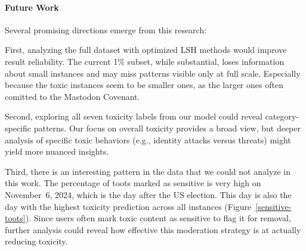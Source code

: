 \newpage

\paragraph{Future Work}
Several promising directions emerge from this research:

First, analyzing the full dataset with optimized LSH methods would improve result reliability. The current 1\% subset, while substantial, loses information about small instances and may miss patterns visible only at full scale. Especially because the toxic instances seem to be smaller ones, as the larger ones often comitted to the Mastodon Covenant.

Second, exploring all seven toxicity labels from our model could reveal category-specific patterns. Our focus on overall toxicity provides a broad view, but deeper analysis of specific toxic behaviors (e.g., identity attacks versus threats) might yield more nuanced insights.

Third, there is an interesting pattern in the data that we could not analyze in this work. The percentage of toots marked as sensitive is very high on November~6, 2024, which is the day after the US election. This day is also the day with the highest toxicity prediction across all instances (Figure~\ref{sensitive-toots}). Since users often mark toxic content as sensitive to flag it for removal, further analysis could reveal how effective this moderation strategy is at actually reducing toxicity. 